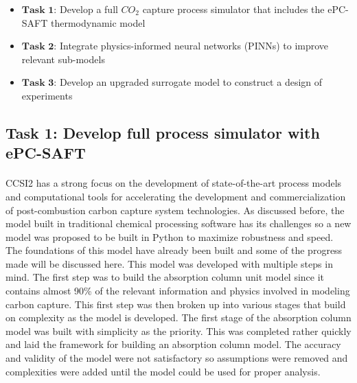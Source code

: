 \documentclass[12pt, letterpaper]{article}
\begin{document}
\begin{itemize}
  \item $\textbf{Task 1:}$ Develop a full $CO_2$ capture process simulator that includes the ePC-SAFT thermodynamic model
  \item $\textbf{Task 2:}$ Integrate physics-informed neural networks (PINNs) to improve relevant sub-models
  \item $\textbf{Task 3:}$ Develop an upgraded surrogate model to construct a design of experiments
\end{itemize}

\subsection{Task 1: Develop full process simulator with ePC-SAFT}

\paragraph{}
CCSI2 has a strong focus on the development of state-of-the-art process models and computational tools for
accelerating the development and commercialization of post-combustion carbon capture system technologies. As discussed before, the model built in traditional chemical processing software has its challenges so a new model was proposed to be built in Python to maximize robustness and speed. The foundations of this model have already been built and some of the progress made will be discussed here. This model was developed with multiple steps in mind. The first step was to build the absorption column unit model since it contains almost 90\% of the relevant information and physics involved in modeling carbon capture. This first step was then broken up into various stages that build on complexity as the model is developed. The first stage of the absorption column model was built with simplicity as the priority. This was completed rather quickly and laid the framework for building an absorption column model. The accuracy and validity of the model were not satisfactory so assumptions were removed and complexities were added until the model could be used for proper analysis. 
\end{document}
